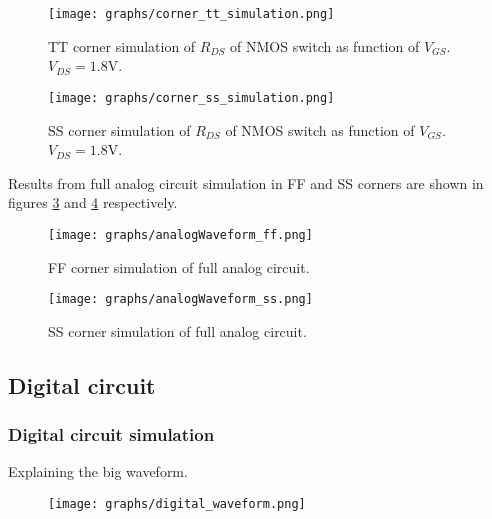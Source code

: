 \begin{figure}
    \centering
    \texttt{[image: graphs/corner\_tt\_simulation.png]}
    \caption{TT corner simulation of $R_{DS}$ of NMOS switch as function of $V_{GS}$. $V_{DS} = 1.8\mathrm{V}$.}
    \label{fig:tt}
\end{figure}

\begin{figure}
    \centering
    \texttt{[image: graphs/corner\_ss\_simulation.png]}
    \caption{SS corner simulation of $R_{DS}$ of NMOS switch as function of $V_{GS}$. $V_{DS} = 1.8\mathrm{V}$.}
    \label{fig:ss}
\end{figure}

Results from full analog circuit simulation in FF and SS corners are shown in figures \ref{fig:ffFull} and \ref{fig:ssFull} respectively.

\begin{figure}
    \centering
    \texttt{[image: graphs/analogWaveform\_ff.png]}
    \caption{FF corner simulation of full analog circuit.}
    \label{fig:ffFull}
\end{figure}

\begin{figure}
    \centering
    \texttt{[image: graphs/analogWaveform\_ss.png]}
    \caption{SS corner simulation of full analog circuit.}
    \label{fig:ssFull}
\end{figure}

\subsection{Digital circuit}

\subsubsection{Digital circuit simulation}

Explaining the big waveform.

\begin{figure}
    \centering
    \texttt{[image: graphs/digital\_waveform.png]}
\end{figure}
